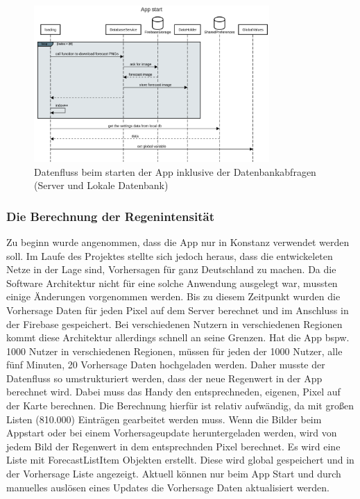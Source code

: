 \begin{figure}[H]
 \centering
 \includegraphics[width=0.8\textwidth,angle=0]{abb/sequence_diagram_app_start}
 \caption[Sequencediagram Appstart]{Datenfluss beim starten der App inklusive der Datenbankabfragen (Server und Lokale Datenbank)}
\label{fig:sequence_diagram_app_start}
\end{figure}

\subsubsection*{Die Berechnung der Regenintensität}
Zu beginn wurde angenommen, dass die App nur in Konstanz verwendet werden soll. 
Im Laufe des Projektes stellte sich jedoch heraus, dass die entwickeleten Netze in der Lage sind, Vorhersagen 
für ganz Deutschland zu machen. Da die Software Architektur nicht für eine solche Anwendung ausgelegt war, mussten einige Änderungen vorgenommen werden. 
Bis zu diesem Zeitpunkt wurden die Vorhersage Daten für jeden Pixel auf dem Server berechnet und im Anschluss in der Firebase gespeichert. 
Bei verschiedenen Nutzern in verschiedenen Regionen kommt diese Architektur allerdings schnell an seine Grenzen. Hat die App bspw. 1000 Nutzer in 
verschiedenen Regionen, müssen für jeden der 1000 Nutzer, alle fünf Minuten, 20 Vorhersage Daten hochgeladen werden. Daher musste der Datenfluss so 
umstrukturiert werden, dass der neue Regenwert in der App berechnet wird. Dabei muss das Handy den entsprechneden, eigenen, Pixel auf der Karte berechnen. 
Die Berechnung hierfür ist relativ aufwändig, da mit großen Listen (810.000) Einträgen gearbeitet werden muss. 
Wenn die Bilder beim Appstart oder bei einem Vorhersageupdate heruntergeladen werden, wird von jedem Bild der Regenwert in dem entsprechnden Pixel berechnet. 
Es wird eine Liste mit ForecastListItem Objekten erstellt. Diese wird global gespeichert und in der Vorhersage Liste angezeigt. 
Aktuell können nur beim App Start und durch manuelles auslösen eines Updates die Vorhersage Daten aktualisiert werden.   

